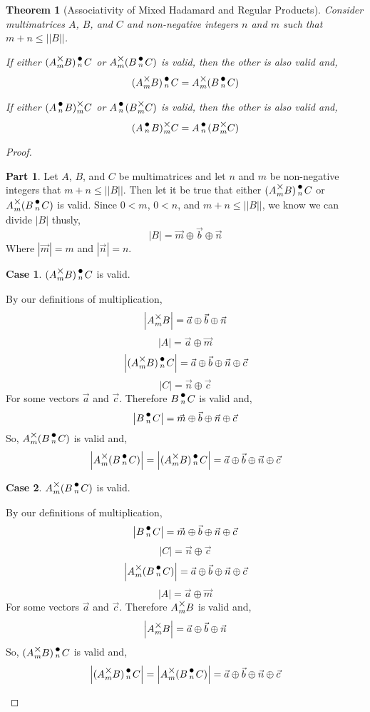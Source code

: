 \documentclass[12pt]{book}
\theoremstyle{plain}
\newtheorem{theorem}{Theorem}[chapter]
\theoremstyle{definition}
\theoremstyle{ppart}
\newtheorem{ppart}{Part}
\theoremstyle{case}
\newtheorem{case}{Case}
\theoremstyle{solution}
\newcommand{\mmult}[1]{\text{\raisebox{1ex}{$\underset{#1}{\times}$}}}
\newcommand{\dmult}[1]{\text{\raisebox{1ex}{$\underset{#1}{\,\bullet\,}$}}}
\newcommand{\shape}[1]{\left|#1\right|}
\begin{document}
\begin{theorem}[Associativity of Mixed Hadamard and Regular Products]
Consider multimatrices $A$, $B$, and $C$ and non-negative integers $n$ and $m$
such that $m+n \le \shape{\shape{B}}$.

If either $(A \mmult{m} B) \dmult{n} C$ or $A \mmult{m} (B \dmult{n} C)$ is
valid, then the other is also valid and,
\[ (A \mmult{m} B) \dmult{n} C = A \mmult{m} (B \dmult{n} C) \]

If either $(A \dmult{n} B) \mmult{m} C$ or $A \dmult{n} (B \mmult{m} C)$ is
valid, then the other is also valid and,
\[ (A \dmult{n} B) \mmult{m} C = A \dmult{n} (B \mmult{m} C) \]
\end{theorem}
\begin{proof}
\begin{ppart}
Let $A$, $B$, and $C$ be multimatrices and let $n$ and $m$ be non-negative integers that $m+n \le \shape{\shape{B}}$.
Then let it be true that either $(A \mmult{m} B) \dmult{n} C$ or $A \mmult{m} (B \dmult{n} C)$ is valid.
Since $0 < m$, $0 < n$, and $m + n \le \shape{\shape{B}}$, we know we can divide $\shape{B}$ thusly,
\[ \shape{B} = \vec{m} \oplus \vec{b} \oplus \vec{n} \]
Where $\shape{\vec{m}} = m$ and $\shape{\vec{n}} = n$.

\begin{case} $(A \mmult{m} B) \dmult{n} C$ is valid.

By our definitions of multiplication,
\[ \shape{A \mmult{m} B} = \vec{a} \oplus \vec{b} \oplus \vec{n} \]
\[ \shape{A} = \vec{a} \oplus \vec{m} \]
\[ \shape{(A \mmult{m} B) \dmult{n} C} = \vec{a} \oplus \vec{b} \oplus \vec{n} \oplus \vec{c} \]
\[ \shape{C} = \vec{n} \oplus \vec{c} \]
For some vectors $\vec{a}$ and $\vec{c}$. 
Therefore $B \dmult{n} C$ is valid and,
\[ \shape{B \dmult{n} C} = \vec{m} \oplus \vec{b} \oplus \vec{n} \oplus \vec{c} \]
So, $A \mmult{m} (B \dmult{n} C)$ is valid and,
\[ \shape{A \mmult{m} (B \dmult{n} C)} = \shape{(A \mmult{m} B) \dmult{n} C} = \vec{a} \oplus \vec{b} \oplus \vec{n} \oplus \vec{c} \]
\end{case}
\begin{case} $A \mmult{m} (B \dmult{n} C)$ is valid.

By our definitions of multiplication,
\[ \shape{B \dmult{n} C} = \vec{m} \oplus \vec{b} \oplus \vec{n} \oplus \vec{c} \]
\[ \shape{C} = \vec{n} \oplus \vec{c} \]
\[ \shape{A \mmult{m} (B \dmult{n} C)} = \vec{a} \oplus \vec{b} \oplus \vec{n} \oplus \vec{c} \]
\[ \shape{A} = \vec{a} \oplus \vec{m} \]
For some vectors $\vec{a}$ and $\vec{c}$. 
Therefore $A \mmult{m} B$ is valid and,
\[ \shape{A \mmult{m} B} = \vec{a} \oplus \vec{b} \oplus \vec{n} \]
So, $(A \mmult{m} B) \dmult{n} C$ is valid and,
\[ \shape{(A \mmult{m} B) \dmult{n} C} = \shape{A \mmult{m} (B \dmult{n} C)} = \vec{a} \oplus \vec{b} \oplus \vec{n} \oplus \vec{c} \]
\end{case}


\end{ppart}
\end{proof}
\end{document}
